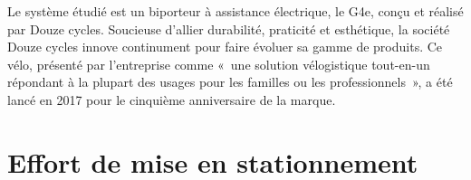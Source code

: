 Le système étudié est un biporteur à assistance électrique, le G4e, conçu et réalisé par Douze cycles. Soucieuse d'allier durabilité, praticité et esthétique, la société Douze cycles innove continument pour faire évoluer sa gamme de produits. Ce vélo, présenté par l'entreprise comme «~une solution vélogistique tout-en-un répondant à la plupart des usages pour les familles ou les professionnels~», a été lancé en 2017 pour le cinquième anniversaire de la marque.
\fi

%
%
%
%

\section{Effort de mise en stationnement \label{ATS_2024_sec2}}
\ifprof
\else


